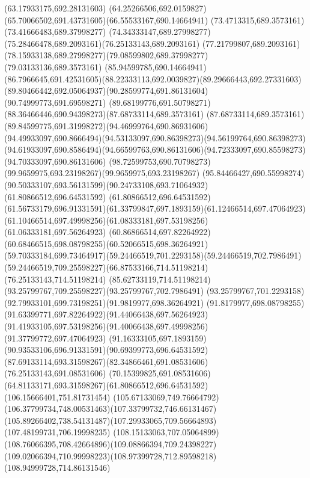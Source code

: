 {{\lineto(63.17933175,692.28131603)
\curveto(64.25266506,692.0159827)(65.70066502,691.43731605)(66.55533167,690.14664941)
\lineto(73.4713315,689.3573161)
\lineto(73.41666483,689.37998277)
\curveto(74.34333147,689.27998277)(75.28466478,689.2093161)(76.25133143,689.2093161)
\curveto(77.21799807,689.2093161)(78.15933138,689.27998277)(79.08599802,689.37998277)
\lineto(79.03133136,689.3573161)
\lineto(85.94599785,690.14664941)
\curveto(86.7966645,691.42531605)(88.22333113,692.0039827)(89.29666443,692.27331603)
\curveto(89.80466442,692.05064937)(90.28599774,691.86131604)(90.74999773,691.69598271)
\curveto(89.68199776,691.50798271)(88.36466446,690.94398273)(87.68733114,689.3573161)
\curveto(87.68733114,689.3573161)(89.84599775,691.31998272)(94.46999764,690.86931606)
\curveto(94.49933097,690.8666494)(94.53133097,690.86398273)(94.56199764,690.86398273)
\curveto(94.61933097,690.8586494)(94.66599763,690.86131606)(94.72333097,690.85598273)
\lineto(94.70333097,690.86131606)
\curveto(98.72599753,690.70798273)(99.9659975,693.23198267)(99.9659975,693.23198267)
\curveto(95.84466427,690.55998274)(90.50333107,693.56131599)(90.24733108,693.71064932)
\moveto(61.80866512,696.64531592)
\lineto(61.80866512,696.64531592)
\curveto(61.56733179,696.91331591)(61.33799847,697.1893159)(61.12466514,697.47064923)
\curveto(61.10466514,697.49998256)(61.08333181,697.53198256)(61.06333181,697.56264923)
\curveto(60.86866514,697.82264922)(60.68466515,698.08798255)(60.52066515,698.36264921)
\curveto(59.70333184,699.73464917)(59.24466519,701.2293158)(59.24466519,702.7986491)
\curveto(59.24466519,709.25598227)(66.87533166,714.51198214)(76.25133143,714.51198214)
\curveto(85.62733119,714.51198214)(93.25799767,709.25598227)(93.25799767,702.7986491)
\curveto(93.25799767,701.2293158)(92.79933101,699.73198251)(91.9819977,698.36264921)
\curveto(91.8179977,698.08798255)(91.63399771,697.82264922)(91.44066438,697.56264923)
\curveto(91.41933105,697.53198256)(91.40066438,697.49998256)(91.37799772,697.47064923)
\curveto(91.16333105,697.1893159)(90.93533106,696.91331591)(90.69399773,696.64531592)
\curveto(87.69133114,693.31598267)(82.34866461,691.08531606)(76.25133143,691.08531606)
\curveto(70.15399825,691.08531606)(64.81133171,693.31598267)(61.80866512,696.64531592)
\moveto(106.15666401,751.81731454)
\curveto(105.67133069,749.76664792)(106.37799734,748.00531463)(107.33799732,746.66131467)
\curveto(105.89266402,738.54131487)(107.29933065,709.56664893)(107.48199731,706.19998235)
\curveto(108.15133063,707.05064899)(108.76066395,708.42664896)(109.08866394,709.24398227)
\curveto(109.02066394,710.99998223)(108.97399728,712.89598218)(108.94999728,714.86131546)
}}
